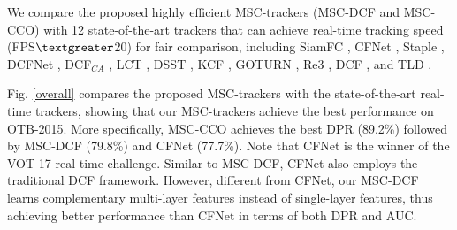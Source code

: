 \documentclass[runningheads]{llncs}
\begin{document}
We compare the proposed highly efficient MSC-trackers (MSC-DCF and MSC-CCO) with 12 state-of-the-art trackers that can achieve real-time tracking speed (FPS$\textgreater$20) for fair comparison, including SiamFC \cite{SiamFC}, CFNet \cite{CFNet}, Staple \cite{Staple}, DCFNet \cite{DCFNet}, {DCF}$_{CA}$ \cite{CACF}, LCT \cite{LCT}, DSST \cite{DSST}, KCF \cite{KCF}, GOTURN \cite{GOTURN}, Re3 \cite{Re3}, DCF \cite{KCF}, and TLD \cite{TLD}.



Fig. \ref{overall} compares the proposed MSC-trackers with the state-of-the-art real-time trackers, showing that our MSC-trackers achieve the best performance on OTB-2015. More specifically, MSC-CCO achieves the best DPR (89.2\%) followed by MSC-DCF (79.8\%) and CFNet (77.7\%). Note that CFNet is the winner of the VOT-17 real-time challenge. Similar to MSC-DCF, CFNet also employs the traditional DCF framework. However, different from CFNet,  our MSC-DCF learns complementary multi-layer features instead of single-layer features, thus achieving better performance than CFNet in terms of both DPR and AUC. 

\end{document}
